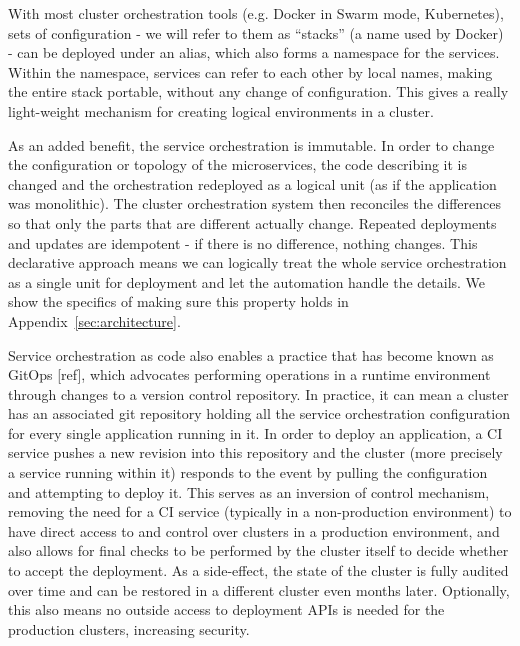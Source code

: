 \documentclass[reprint,amsmath,amssymb,aps]{revtex4-1}
\begin{document}
With most cluster orchestration tools (e.g. Docker in Swarm mode, Kubernetes), sets of configuration - we will refer to them as “stacks” (a name used by Docker) - can be deployed under an alias, which also forms a namespace for the services. Within the namespace, services can refer to each other by local names, making the entire stack portable, without any change of configuration. This gives a really light-weight mechanism for creating logical environments in a cluster.

As an added benefit, the service orchestration is immutable. In order to change the configuration or topology of the microservices, the code describing it is changed and the orchestration redeployed as a logical unit (as if the application was monolithic). The cluster orchestration system then reconciles the differences so that only the parts that are different actually change. Repeated deployments and updates are idempotent - if there is no difference, nothing changes. This declarative approach means we can logically treat the whole service orchestration as a single unit for deployment and let the automation handle the details. We show the specifics of making sure this property holds in Appendix~\ref{sec:architecture}.

Service orchestration as code also enables a practice that has become known as GitOps [ref], which advocates performing operations in a runtime environment through changes to a version control repository. In practice, it can mean a cluster has an associated git repository holding all the service orchestration configuration for every single application running in it. In order to deploy an application, a CI service pushes a new revision into this repository and the cluster (more precisely a service running within it) responds to the event by pulling the configuration and attempting to deploy it. This serves as an inversion of control mechanism, removing the need for a CI service (typically in a non-production environment) to have direct access to and control over clusters in a production environment, and also allows for final checks to be performed by the cluster itself to decide whether to accept the deployment. As a side-effect, the state of the cluster is fully audited over time and can be restored in a different cluster even months later. Optionally, this also means no outside access to deployment APIs is needed for the production clusters, increasing security.
\end{document}
